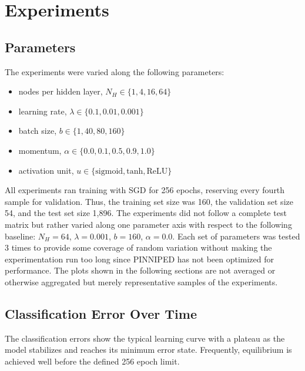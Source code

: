 \documentclass[10pt,epsf]{article}
\begin{document}
\section{Experiments}{
  \subsection{Parameters}{
    The experiments were varied along the following parameters:
    \begin{itemize}
    \item{nodes per hidden layer, $N_H \in \{1, 4, 16, 64\}$}
    \item{learning rate, $\lambda \in \{0.1, 0.01, 0.001\}$}
    \item{batch size, $b \in \{1, 40, 80, 160\}$}
    \item{momentum, $\alpha \in \{0.0, 0.1, 0.5, 0.9, 1.0\}$}
    \item{activation unit, $u \in \{\text{sigmoid}, \text{tanh}, \text{ReLU}\}$}
    \end{itemize}
    All experiments ran training with SGD for 256 epochs, reserving every fourth sample for validation.
    Thus, the training set size was 160, the validation set size 54, and the test set size 1,896.
    The experiments did not follow a complete test matrix but rather varied along one parameter axis
    with respect to the following baseline: $N_H = 64$, $\lambda = 0.001$, $b = 160$, $\alpha = 0.0$.
    Each set of parameters was tested 3 times to provide some coverage of random variation without
    making the experimentation run too long since PINNIPED has not been optimized for performance.
    The plots shown in the following sections are not averaged or otherwise aggregated but merely
    representative samples of the experiments.
  }
  \subsection{Classification Error Over Time}{
    The classification errors show the typical learning curve with a plateau as the model stabilizes
    and reaches its minimum error state. Frequently, equilibrium is achieved well before the defined
    256 epoch limit.
}}
\end{document}
